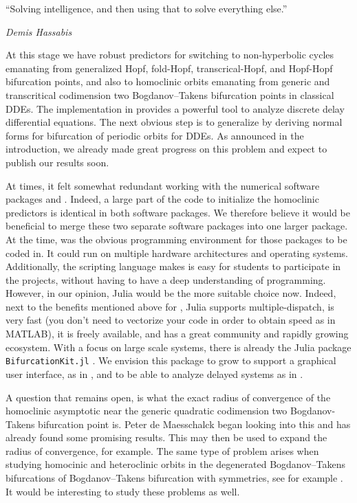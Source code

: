 \epigraph{ ``Solving intelligence, and then using that to solve everything
else.''}{{\it Demis Hassabis}}
At this stage we have robust predictors for switching to  non-hyperbolic cycles
emanating from generalized Hopf, fold-Hopf, transcrical-Hopf, and Hopf-Hopf
bifurcation points, and also to homoclinic orbits emanating from generic and
transcritical codimension two Bogdanov--Takens bifurcation points in classical
DDEs. The implementation in \DDEBIFTOOL provides a powerful tool to analyze
discrete delay differential equations. The next obvious step is to generalize
\cite{Kuznetsov2005,DeWitte2013,DeWitte2014} by deriving normal forms for
bifurcation of periodic orbits for DDEs. As announced in the introduction, we
already made great progress on this problem and expect to publish our results
soon.

At times, it felt somewhat redundant working with the numerical software packages
\DDEBIFTOOL and \MATCONT. Indeed, a large part of the code to initialize the
homoclinic predictors is identical in both software packages. We therefore
believe it would be beneficial to merge these two separate software packages into
one larger package. At the time, \MATLAB was the obvious programming environment
for those packages to be coded in. It could run on multiple hardware
architectures and operating systems. Additionally, the scripting language makes
is easy for students to participate in the projects, without having to have a
deep understanding of programming. However, in our opinion, Julia would be the
more suitable choice now. Indeed, next to the benefits mentioned above for
\MATLAB, Julia supports multiple-dispatch, is very fast (you don't need to
vectorize your code in order to obtain speed as in MATLAB), it is freely
available, and has a great community and rapidly growing ecosystem. With a focus
on large scale systems, there is already the Julia package
\texttt{BifurcationKit.jl} \cite{veltz:hal-02902346}. We
envision this package to grow to support a graphical user interface, as in
\MATCONT, and to be able to analyze delayed systems as in \DDEBIFTOOL.

A question that remains open, is what the exact radius of convergence of the
homoclinic asymptotic near the generic quadratic codimension two Bogdanov-Takens
bifurcation  point is. Peter de Maesschalck began looking into this and has
already found some promising results. This may then be used to expand the radius
of convergence, for example. The same type of problem arises when studying
homocinic and heteroclinic orbits in the degenerated Bogdanov--Takens
bifurcations of Bogdanov--Takens bifurcation with symmetries, see for example
\cite{chow_li_wang_1994}. It would be interesting to study these problems as
well. 

